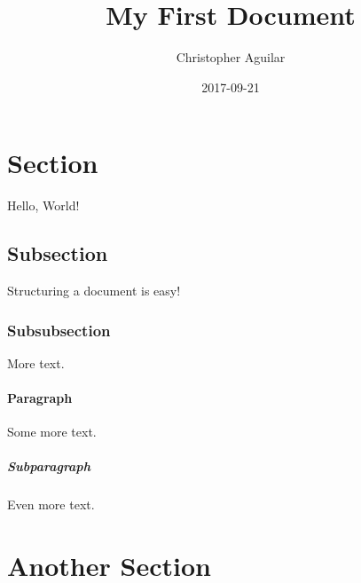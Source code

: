\documentclass{article}
\title{My First Document}
\date{2017-09-21}
\author{Christopher Aguilar}
\begin{document}
    \maketitle

    \newpage
    \tableofcontents

    \newpage

    \section{Section}
    Hello, World!

        \subsection{Subsection}
        Structuring a document is easy!

            \subsubsection{Subsubsection}
            More text.

    \paragraph{Paragraph}
    Some more text.

        \subparagraph{Subparagraph}
        Even more text.

    \section{Another Section}
\end{document}

